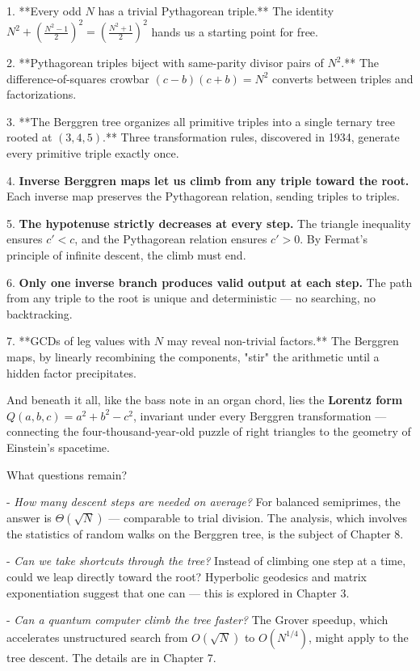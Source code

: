 1. **Every odd $N$ has a trivial Pythagorean triple.** The identity $N^2 + \left(\frac{N^2-1}{2}\right)^2 = \left(\frac{N^2+1}{2}\right)^2$ hands us a starting point for free.

2. **Pythagorean triples biject with same-parity divisor pairs of $N^2$.** The difference-of-squares crowbar $(c-b)(c+b) = N^2$ converts between triples and factorizations.

3. **The Berggren tree organizes all primitive triples into a single ternary tree rooted at $(3,4,5)$.** Three transformation rules, discovered in 1934, generate every primitive triple exactly once.

4. \textbf{Inverse Berggren maps let us climb from any triple toward the root.} Each inverse map preserves the Pythagorean relation, sending triples to triples.

5. \textbf{The hypotenuse strictly decreases at every step.} The triangle inequality ensures $c' < c$, and the Pythagorean relation ensures $c' > 0$. By Fermat's principle of infinite descent, the climb must end.

6. \textbf{Only one inverse branch produces valid output at each step.} The path from any triple to the root is unique and deterministic --- no searching, no backtracking.

7. **GCDs of leg values with $N$ may reveal non-trivial factors.** The Berggren maps, by linearly recombining the components, "stir" the arithmetic until a hidden factor precipitates.

And beneath it all, like the bass note in an organ chord, lies the \textbf{Lorentz form} $Q(a,b,c) = a^2 + b^2 - c^2$, invariant under every Berggren transformation --- connecting the four-thousand-year-old puzzle of right triangles to the geometry of Einstein's spacetime.

What questions remain?

- \textit{How many descent steps are needed on average?} For balanced semiprimes, the answer is $\Theta(\sqrt{N})$ --- comparable to trial division. The analysis, which involves the statistics of random walks on the Berggren tree, is the subject of Chapter 8.

- \textit{Can we take shortcuts through the tree?} Instead of climbing one step at a time, could we leap directly toward the root? Hyperbolic geodesics and matrix exponentiation suggest that one can --- this is explored in Chapter 3.

- \textit{Can a quantum computer climb the tree faster?} The Grover speedup, which accelerates unstructured search from $O(\sqrt{N})$ to $O(N^{1/4})$, might apply to the tree descent. The details are in Chapter 7.

